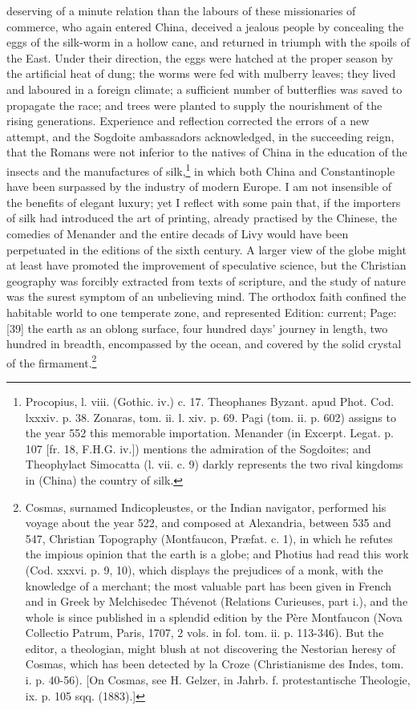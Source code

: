deserving of a minute relation than the labours of these missionaries of commerce, who again entered China, deceived a jealous people by concealing the eggs of the silk-worm in a hollow cane, and returned in triumph with the spoils of the East. Under their direction, the eggs were hatched at the proper season by the artificial heat of dung; the worms were fed with mulberry leaves; they lived and laboured in a foreign climate; a sufficient number of butterflies was saved to propagate the race; and trees were planted to supply the nourishment of the rising generations. Experience and reflection corrected the errors of a new attempt, and the Sogdoite ambassadors acknowledged, in the succeeding reign, that the Romans were not inferior to the natives of China in the education of the insects and the manufactures of silk,\footnote{Procopius, l. viii. (Gothic. iv.) c. 17. Theophanes Byzant. apud Phot. Cod. lxxxiv. p. 38. Zonaras, tom. ii. l. xiv. p. 69. Pagi (tom. ii. p. 602) assigns to the year 552 this memorable importation. Menander (in Excerpt. Legat. p. 107 [fr. 18, F.H.G. iv.]) mentions the admiration of the Sogdoites; and Theophylact Simocatta (l. vii. c. 9) darkly represents the two rival kingdoms in (China) the country of silk.} in which both China and Constantinople have been surpassed by the industry of modern Europe. I am not insensible of the benefits of elegant luxury; yet I reflect with some pain that, if the importers of silk had introduced the art of printing, already practised by the Chinese, the comedies of Menander and the entire decads of Livy would have been perpetuated in the editions of the sixth century. A larger view of the globe might at least have promoted the improvement of speculative science, but the Christian geography was forcibly extracted from texts of scripture, and the study of nature was the surest symptom of an unbelieving mind. The orthodox faith confined the habitable world to one temperate zone, and represented Edition: current; Page: [39] the earth as an oblong surface, four hundred days\texthebrew{}’ journey in length, two hundred in breadth, encompassed by the ocean, and covered by the solid crystal of the firmament.\footnote{Cosmas, surnamed Indicopleustes, or the Indian navigator, performed his voyage about the year 522, and composed at Alexandria, between 535 and 547, Christian Topography (Montfaucon, Præfat. c. 1), in which he refutes the impious opinion that the earth is a globe; and Photius had read this work (Cod. xxxvi. p. 9, 10), which displays the prejudices of a monk, with the knowledge of a merchant; the most valuable part has been given in French and in Greek by Melchisedec Thévenot (Relations Curieuses, part i.), and the whole is since published in a splendid edition by the Père Montfaucon (Nova Collectio Patrum, Paris, 1707, 2 vols. in fol. tom. ii. p. 113-346). But the editor, a theologian, might blush at not discovering the Nestorian heresy of Cosmas, which has been detected by la Croze (Christianisme des Indes, tom. i. p. 40-56). [On Cosmas, see H. Gelzer, in Jahrb. f. protestantische Theologie, ix. p. 105 sqq. (1883).]}

